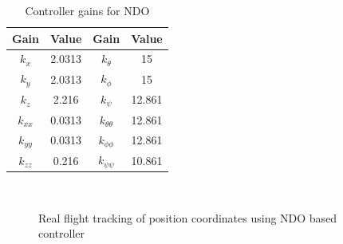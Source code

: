 \documentclass[letterpaper%
, twoside%
, 12pt%
,memoire%
, english%
,creativecommons,hyperref%
]{thETS}
\begin{document}
\begin{table}
\parbox{0.65\textwidth}{\caption{Controller gains for NDO}\label{Tab:realControllerGains}} 
\begin{tabular}{|c|c|c|c|}
\hline
{\bf Gain} & {\bf Value} & {\bf Gain}         & {\bf Value}  \\ \hline
$k_x$      & 2.0313      & $k_\theta$         & 15           \\ \hline
$k_y$      & 2.0313      & $k_\phi$           & 15           \\ \hline
$k_z$      & 2.216       & $k_\psi$           & 12.861       \\ \hline 
$k_{xx}$   & 0.0313      & $k_{\theta\theta}$ & 12.861       \\ \hline
$k_{yy}$   &  0.0313     & $k_{\phi\phi}$     & 12.861       \\ \hline
$k_{zz}$   & 0.216       & $k_{\psi\psi}$     & 10.861       \\ \hline 
\end{tabular}
\end{table}

\begin{figure}[H]
	\centering
	 \\ \parbox{0.75\textwidth}{\caption{Real flight tracking of position coordinates using NDO based controller\label{Fig:xyztracNDO}}}
\end{figure}
\end{document}
